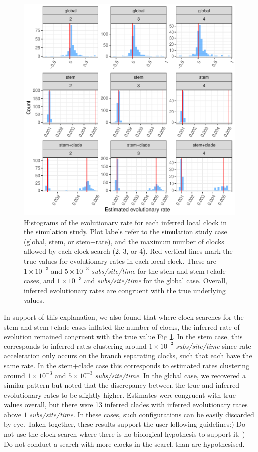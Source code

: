 \documentclass{article}
\begin{document}
\begin{figure}[H]
\centering
\includegraphics[width = 0.8\linewidth]{clockError.pdf}
\caption{{Histograms of the evolutionary rate for each inferred local clock in the simulation study. Plot labels refer to the simulation study case (global, stem, or stem+rate), and the maximum number of clocks allowed by each clock search (2, 3, or 4). Red vertical lines mark the true values for evolutionary rates in each local clock. These are $1\times10^{-3}$ and $5\times10^{-3}$ \textit{subs/site/time} for the stem and stem+clade cases, and $1\times10^{-3}$ and \textit{subs/site/time} for the global case. Overall, inferred evolutionary rates are congruent with the true underlying values.}}
\label{fig:clockError}
\end{figure}

{In support of this explanation, we also found that where clock searches for the stem and stem+clade cases inflated the number of clocks, the inferred rate of evolution remained congruent with the true value Fig \ref{fig:clockError}. In the stem case, this corresponds to inferred rates clustering around $1\times10^{-3}$ \textit{subs/site/time} since rate acceleration only occurs on the branch separating clocks, such that each have the same rate. In the stem+clade case this corresponds to estimated rates clustering around $1\times10^{-3}$ and $5\times10^{-3}$ \textit{subs/site/time}. In the global case, we recovered a similar pattern but noted that the discrepancy between the true and inferred evolutionary rates to be slightly higher. Estimates were congruent with true values overall, but there were 13 inferred clades with inferred evolutionary rates above $1$ \textit{subs/site/time}. In these cases, such configurations can be easily discarded by eye. Taken together, these results support the user following guidelines:) Do not use the clock search where there is no biological hypothesis to support it. ) Do not conduct a search with more clocks in the search than are hypothesised.}
\end{document}
